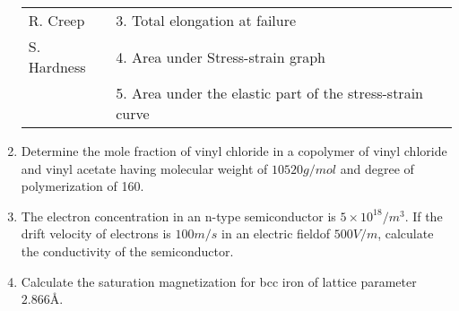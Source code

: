 \documentclass[journal]{IEEEtran}
\begin{document}
\begin{enumerate}[start=10]
\begin{tabular}{l l}
R. Creep & 3. Total elongation at failure \\
S. Hardness & 4. Area under Stress-strain graph \\
 & 5. Area under the elastic part of the stress-strain curve \\
 \end{tabular}
 \begin{enumerate}
\end{enumerate}
\item %
Determine the mole fraction of vinyl chloride in a copolymer of vinyl chloride  and vinyl acetate  having molecular weight of $10520 g/mol$ and degree of polymerization of 160. 
\begin{enumerate}
\end{enumerate}
\item %
The electron concentration in an n-type semiconductor is $5 \times 10^{18}/m^3$. If the drift velocity of electrons is $100m/s$ in an electric fieldof $500V/m $, calculate the conductivity of the semiconductor.
\begin{enumerate}
\end{enumerate}
\item %
Calculate the saturation magnetization  for bcc iron of lattice parameter $2.866 \text{\AA} $. 
\begin{enumerate}
\end{enumerate}
\end{enumerate}
\end{document}

